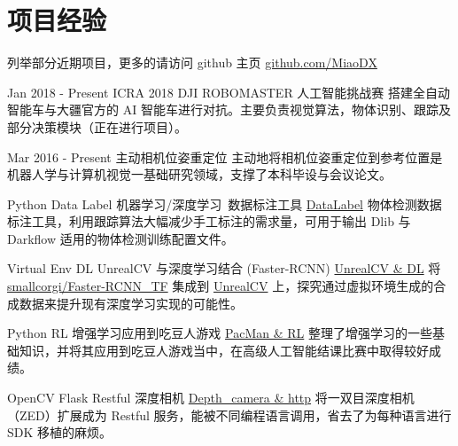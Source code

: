 \documentclass[utf8]{twentysecondcv} %
\begin{document}
\section{项目经验}
\begin{twenty}

    \twentyitem
        {}
        {}        
        {列举部分近期项目，更多的请访问 github 主页}
        {\href{https://github.com/MiaoDX/}{github.com/MiaoDX}}
        {}
        {}
          
    \twentyitem
    {Jan 2018 - }
    {Present}
    {ICRA 2018 DJI ROBOMASTER 人工智能挑战赛}
    {}
    {}
    {搭建全自动智能车与大疆官方的 AI 智能车进行对抗。主要负责视觉算法，物体识别、跟踪及部分决策模块（正在进行项目）。}        
    
    \twentyitem
    {Mar 2016 -}
    {Present}
    {主动相机位姿重定位}
    {}
    {}
	{主动地将相机位姿重定位到参考位置是机器人学与计算机视觉一基础研究领域，支撑了本科毕设与会议论文。}
    
	\twentyitem
        {Python}
		{Data Label}
        {机器学习/深度学习\ 数据标注工具}
        {\href{https://github.com/MiaoDX/DataLabel}{DataLabel}}
        {}
        {物体检测数据标注工具，利用跟踪算法大幅减少手工标注的需求量，可用于输出 Dlib 与 Darkflow 适用的物体检测训练配置文件。}
          
    \twentyitem
        {Virtual Env}
      	{DL}
        {UnrealCV 与深度学习结合 (Faster-RCNN)}
        {\href{https://github.com/MiaoDX/unrealcv_examples/}{UnrealCV \& DL}}
        {}
        {将 \href{https://github.com/smallcorgi/Faster-RCNN\_TF}{smallcorgi/Faster-RCNN\_TF} 集成到 \href{https://github.com/unrealcv/unrealcv}{UnrealCV} 上，探究通过虚拟环境生成的合成数据来提升现有深度学习实现的可能性。}
                 
    \twentyitem
        {Python}
		{RL}
        {增强学习应用到吃豆人游戏}
        {\href{https://github.com/MiaoDX/hand_in_homework/tree/master/Advanced\_AI/}{PacMan \& RL}}
        {}
        {整理了增强学习的一些基础知识，并将其应用到吃豆人游戏当中，在高级人工智能结课比赛中取得较好成绩。}
        
		\twentyitem
        {OpenCV}
        {Flask}
        {Restful 深度相机}
        {\href{https://github.com/MiaoDX/depth\_camera}{Depth\_camera \& http}}
        {}
        {将一双目深度相机（ZED）扩展成为 Restful 服务，能被不同编程语言调用，省去了为每种语言进行 SDK 移植的麻烦。}


\end{twenty}
\end{document}
